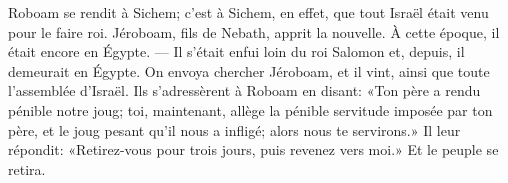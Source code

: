 Roboam se rendit à Sichem;
	c’est à Sichem, en effet, que tout Israël était venu pour le faire roi.
Jéroboam, fils de Nebath, apprit la nouvelle.
	À cette époque, il était encore en Égypte.
	--- Il s’était enfui loin du roi Salomon et, depuis, il demeurait en Égypte.
On envoya chercher Jéroboam, et il vint, ainsi que toute l’assemblée d’Israël.
Ils s’adressèrent à Roboam en disant:
	«Ton père a rendu pénible notre joug;
	toi, maintenant, allège la pénible servitude imposée par ton père,
	et le joug pesant qu’il nous a infligé;
	alors nous te servirons.»
Il leur répondit: «Retirez-vous pour trois jours, puis revenez vers moi.»
Et le peuple se retira.
